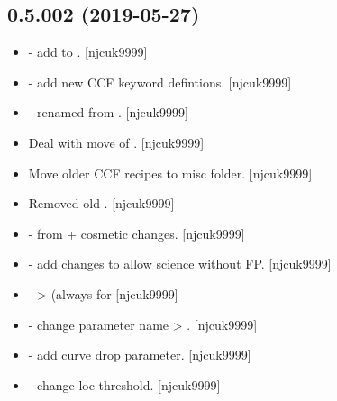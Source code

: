 \documentclass[a4paper,10pt,english]{report}
\begin{document}
\subsection{0.5.002 (2019-05-27)}
\label{\detokenize{misc/changelog:id135}}\begin{itemize}
\item {} 
 - add  to . {[}njcuk9999{]}

\item {} 
 - add new CCF keyword defintions. {[}njcuk9999{]}

\item {} 
 - renamed from .
{[}njcuk9999{]}

\item {} 
Deal with move of . {[}njcuk9999{]}

\item {} 
Move older CCF recipes to misc folder. {[}njcuk9999{]}

\item {} 
Removed old . {[}njcuk9999{]}

\item {} 
 - from  + cosmetic changes.
{[}njcuk9999{]}

\item {} 
 - add changes to allow science without FP.
{[}njcuk9999{]}

\item {} 
 -  \textendash{}\textgreater{}  (always
for  {[}njcuk9999{]}

\item {} 
 - change parameter name  \textendash{}\textgreater{}
. {[}njcuk9999{]}

\item {} 
 - add curve drop parameter. {[}njcuk9999{]}

\item {} 
 - change loc threshold. {[}njcuk9999{]}


\end{itemize}
\end{document}
